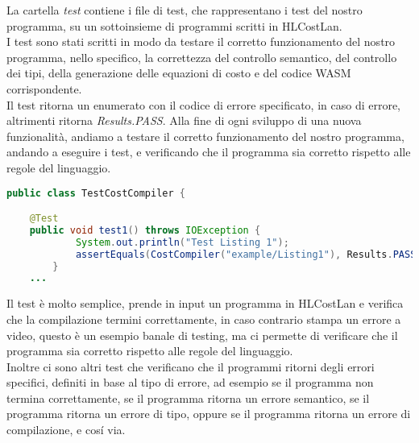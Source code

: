 \documentclass[../../main.tex]{subfiles}
\begin{document}
La cartella \textit{test} contiene i file di test, che rappresentano i test del nostro programma, su un sottoinsieme di programmi scritti in HLCostLan.\\
I test sono stati scritti in modo da testare il corretto funzionamento del nostro programma, nello specifico, la correttezza del controllo semantico, del controllo dei tipi, della generazione delle equazioni di costo e del codice WASM corrispondente.\\
Il test ritorna un enumerato con il codice di errore specificato, in caso di errore, altrimenti ritorna \textit{Results.PASS}.
Alla fine di ogni sviluppo di una nuova funzionalità, andiamo a testare il corretto funzionamento del nostro programma, andando a eseguire i test, e verificando che il programma sia corretto rispetto alle regole del linguaggio.\\
\begin{lstlisting}[language=Java, caption={Esempio Testing}]
public class TestCostCompiler {

    @Test
    public void test1() throws IOException {
            System.out.println("Test Listing 1");
            assertEquals(CostCompiler("example/Listing1"), Results.PASS);
        }
    ...
\end{lstlisting} 
Il test è molto semplice, prende in input un programma in HLCostLan e verifica che la compilazione termini correttamente, in caso contrario stampa un errore a video, questo è un esempio banale di testing, ma ci permette di verificare che il programma sia corretto rispetto alle regole del linguaggio.\\
Inoltre ci sono altri test che verificano che il programmi ritorni degli errori specifici, definiti in base al tipo di errore, ad esempio se il programma non termina correttamente, se il programma ritorna un errore semantico, se il programma ritorna un errore di tipo, oppure se il programma ritorna un errore di compilazione, e cosí via.\\
\end{document}
